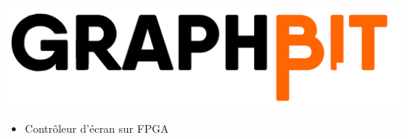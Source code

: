 \documentclass[10pt,a4paper,withhyper]{altacv}
\begin{document}
\divider

\hfill\begin{minipage}{2.5cm}
    \includegraphics[width=\linewidth]{figures/graphbit}
\end{minipage}
\vspace{-0.66cm}

\begin{itemize}
\item Contrôleur d'écran sur FPGA
\end{itemize}

\medskip

\end{document}
